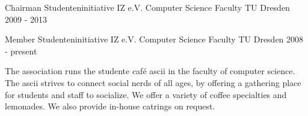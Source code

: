 \begin{cventries}

  \cventry
    {Chairman Studenteninitiative IZ e.V.}
    {Computer Science Faculty}
    {TU Dresden}
    {2009 - 2013}
    { }

  \cventry
    {Member Studenteninitiative IZ e.V.}
    {Computer Science Faculty}
    {TU Dresden}
    {2008 - present}
    {
      \begin{cvitems}
      \item[] {
          The association runs the studente caf\'{e} ascii in the faculty of computer science.
          The ascii strives to connect social nerds of all ages,
          by offering a gathering place for students and staff to socialize.
          We offer a variety of coffee specialties and lemonades.
          We also provide in-house catrings on request.}
      \end{cvitems}
    }

\end{cventries}
